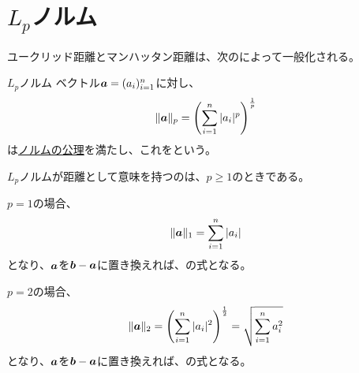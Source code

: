 \documentclass[../../../topic_linear-algebra]{subfiles}
\begin{document}
\sectionline
\section{$L_p$ノルム}

ユークリッド距離とマンハッタン距離は、次のによって一般化される。

\begin{definition}{$L_p$ノルム}
  ベクトル$\vb*{a} = (a_i)_{i=1}^n$に対し、
  \begin{equation*}
    \|\vb*{a}\|_p = \left( \sum_{i=1}^n |a_i|^p \right)^{\frac{1}{p}}
  \end{equation*}
  は\hyperref[def:norm-axioms]{ノルムの公理}を満たし、これをという。
\end{definition}

$L_p$ノルムが距離として意味を持つのは、$p \geq 1$のときである。

\br

$p=1$の場合、
\begin{equation*}
  \|\vb*{a}\|_1 = \sum_{i=1}^n |a_i|
\end{equation*}
となり、$\vb*{a}$を$\vb*{b}-\vb*{a}$に置き換えれば、の式となる。

\br

$p=2$の場合、
\begin{equation*}
  \|\vb*{a}\|_2 = \left( \sum_{i=1}^n |a_i|^2 \right)^{\frac{1}{2}} = \sqrt{\sum_{i=1}^n a_i^2}
\end{equation*}
となり、$\vb*{a}$を$\vb*{b}-\vb*{a}$に置き換えれば、の式となる。
\end{document}
